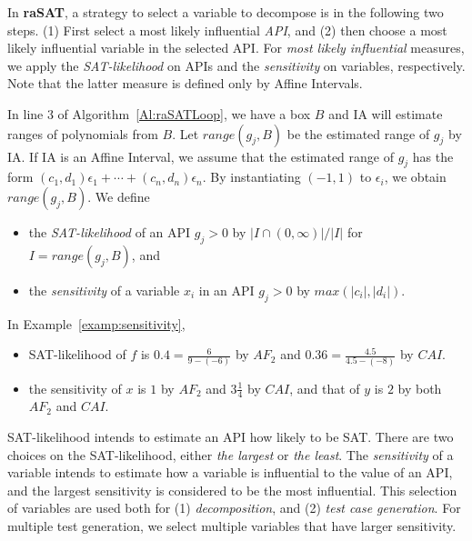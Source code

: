 \documentclass[runningheads,a4paper,oribibl]{llncs}
\newcommand{\suppress}[1]{} %
\begin{document}
\suppress{
With several hundred variables, we observe that an SMT solver works
when either SAT, or UNSAT with small UNSAT core.
%
For the latter, we need an efficient heuristics to find an UNSAT core, which is left as future work. 
For the former, the keys are how to choose variables to decompose, and 
how to choose a box to explore.
}%

In {\bf raSAT}, a strategy to select a variable to decompose is in the following two steps. 
(1) First select a most likely influential {\em API}, and
(2) then choose a most likely influential variable in the selected API. 
For {\em most likely influential} measures, we apply the {\em SAT-likelihood} on APIs and
the {\em sensitivity} on variables, respectively. Note that the latter measure is defined
only by Affine Intervals. 

\sloppy

In line 3 of Algorithm~\ref{Al:raSATLoop}, we have a box $B$ and IA will estimate ranges of polynomials from $B$.
Let $range(g_j, B)$ be the estimated range of $g_j$ by IA. 
If IA is an Affine Interval,
we assume that the estimated range of $g_j$ has the form
${(c_1,d_1)\epsilon_1 + \cdots + (c_n,d_n)\epsilon_n}$.
By instantiating $(-1,1)$ to $\epsilon_i$, we obtain $range(g_j, B)$. 
We define 
\begin{itemize} 
\item the {\em SAT-likelihood} of an API $g_j > 0$ by $| I \cap (0,\infty) | / |I|$
  for  $I = range(g_j, B)$, and 
\item the {\em sensitivity} of a variable $x_i$ in an API $g_j > 0$ by $max(|c_i|, |d_i|)$. 
\end{itemize} 

\begin{example} \label{examp:SATlikelihood}
In Example~\ref{examp:sensitivity}, 
\begin{itemize}
\item SAT-likelihood of $f$ is $0.4= \frac{6}{9-(-6)}$ by $AF_2$ 
and $0.36 = \frac{4.5}{4.5-(-8)}$ by $CAI$. 
\item the sensitivity of $x$ is $1$ by $AF_2$ and $3\frac{1}{4}$ by $CAI$,
  and that of $y$ is $2$ by both $AF_2$ and $CAI$. 
\end{itemize}
\end{example}


SAT-likelihood intends to estimate an API how likely to be SAT. 
There are two choices on the SAT-likelihood, either {\em the largest} or {\em the least}. 
The {\em sensitivity} of a variable intends to estimate how a variable is influential
to the value of an API, and the largest sensitivity is considered to be the most influential. 
This selection of variables are used both for (1) {\em decomposition}, and 
(2) {\em test case generation}. 
For multiple test generation, we select multiple variables that have larger sensitivity. 
\end{document}
